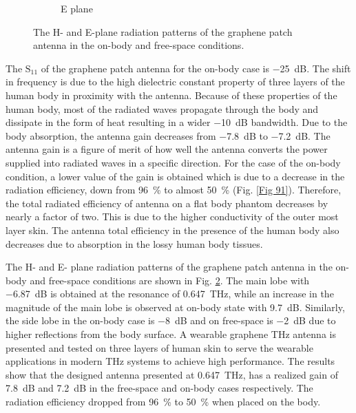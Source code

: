 \documentclass[12pt]{suhbook}
\begin{document}
\begin{figure}[hbt!]
\begin{subfigure}{.6\textwidth}
  \caption{E plane}
  \label{fig:sfig2}
\end{subfigure}
\caption{The H- and E-plane radiation patterns of the graphene patch antenna in the on-body and free-space conditions.}
\label{fig 14b}
\end{figure}
% 
The $\mathrm{S_{11}}$ of the graphene patch antenna for the on-body case is \SI{-25}{\dB}. The shift in frequency is due to the high dielectric constant property of three layers of the human body in proximity with the antenna. Because of these properties of the human body, most of the radiated waves propagate through the body and dissipate in the form of heat resulting in a wider \SI{-10}{\dB} bandwidth. Due to the body absorption, the antenna gain decreases from \SI{-7.8}{\dB} to \SI{-7.2}{\dB}. The antenna gain is a figure of merit of how well the antenna converts the power supplied into radiated waves in a specific direction. For the case of the on-body condition, a lower value of the gain is obtained which is due to a decrease in the radiation efficiency, down from \SI{96}{\percent} to almost \SI{50}{\percent} (Fig. \ref{Fig 91}). Therefore, the total radiated efficiency of antenna on a flat body phantom decreases by nearly a factor of two. This is due to the higher conductivity of the outer most layer skin. The antenna total efficiency in the presence of the human body also decreases due to absorption in the lossy human body tissues. 

The H- and E- plane radiation patterns of the graphene patch antenna in the on-body and free-space conditions are shown in Fig. \ref{fig 14b}. The main lobe with \SI{-6.87}{\dB} is obtained at the resonance of \SI{0.647}{\THz}, while an increase in the magnitude of the main lobe is observed at on-body state with \SI{9.7}{\dB}. Similarly, the side lobe in the on-body case is \SI{-8}{\dB} and on free-space is \SI{-2}{\dB}  due to higher reflections from the body surface. A wearable graphene THz antenna is presented and tested on three layers of human skin to serve the wearable applications in modern THz systems to achieve high performance. The results show that the designed antenna presented at \SI{0.647}{\THz}, has a realized gain of \SI{7.8}{\dB} and \SI{7.2}{\dB} in the free-space and on-body cases respectively. The radiation efficiency dropped from \SI{96}{\percent} to \SI{50}{\percent} when placed on the body.
% 
\end{document}
